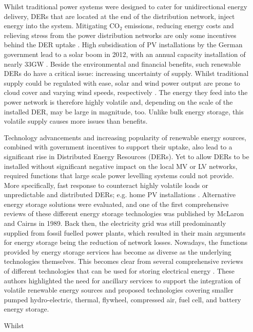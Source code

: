 Whilst traditional power systems were designed to cater for unidirectional energy delivery, DERs that are located at the end of the distribution network, inject energy into the system.
Mitigating $\text{CO}_2$ emissions, reducing energy costs and relieving stress from the power distribution networks are only some incentives behind the DER uptake \cite{Peng2009}.
High subsidisation of PV installations by the German government lead to a solar boom in 2012, with an annual capacity installation of nearly 33GW \cite{Hockenos2013}.
Beside the environmental and financial benefits, such renewable DERs do have a critical issue: increasing uncertainty of supply.
Whilst traditional supply could be regulated with ease, solar and wind power output are prone to cloud cover and varying wind speeds, respectively \cite{Jewell1987}.
The energy they feed into the power network is therefore highly volatile and, depending on the scale of the installed DER, may be large in magnitude, too.
Unlike bulk energy storage, this volatile supply causes more issues than benefits.

Technology advancements and increasing popularity of renewable energy sources, combined with government incentives to support their uptake, also lead to a significant rise in Distributed Energy Resources (DERs).
Yet to allow DERs to be installed without significant negative impact on the local MV or LV networks, required functions that large scale power levelling systems could not provide. More specifically, fast response to counteract highly volatile loads or unpredictable and distributed DERs; e.g. home PV installations \cite{Jewell1987}. Alternative energy storage solutions were evaluated, and one of the first comprehensive reviews of these different energy storage technologies was published by McLaron and Cairns \cite{McLarnon1989} in 1989. Back then, the electricity grid was still predominantly supplied from fossil fuelled power plants, which resulted in their main arguments for energy storage being the reduction of network losses. Nowadays, the functions provided by energy storage services has become as diverse as the underlying technologies themselves. This becomes clear from several comprehensive reviews of different technologies that can be used for storing electrical energy \cite{Ibrahim2008, Chen2009, Hadjipaschalis2009, Luo2015}. These authors highlighted the need for ancillary services to support the integration of volatile renewable energy sources and proposed technologies covering smaller pumped hydro-electric, thermal, flywheel, compressed air, fuel cell, and battery energy storage. 

Whilst 